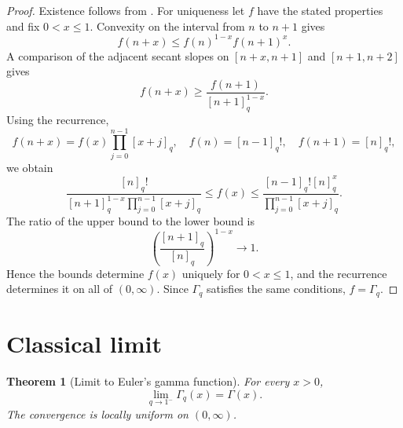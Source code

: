 \documentclass[11pt,a4paper,oneside,openany]{book}
\newtheorem{theorem}{Theorem}[chapter]
\theoremstyle{definition}
\theoremstyle{remark}
\begin{document}
\begin{proof}
Existence follows from .  For uniqueness let $f$ have the stated properties and fix $0<x\le1$.  Convexity on the interval from $n$ to $n+1$ gives
\[
 f(n+x)\le f(n)^{1-x}f(n+1)^x.
\]
A comparison of the adjacent secant slopes on $[n+x,n+1]$ and $[n+1,n+2]$ gives
\[
 f(n+x)\ge\frac{f(n+1)}{[n+1]_q^{1-x}}.
\]
Using the recurrence,
\[
 f(n+x)=f(x)\prod_{j=0}^{n-1}[x+j]_q,
 \quad
 f(n)=[n-1]_q!,
 \quad
 f(n+1)=[n]_q!,
\]
we obtain
\[
 \frac{[n]_q!}
 {[n+1]_q^{1-x}\prod_{j=0}^{n-1}[x+j]_q}
 \le f(x)\le
 \frac{[n-1]_q![n]_q^x}
 {\prod_{j=0}^{n-1}[x+j]_q}.
\]
The ratio of the upper bound to the lower bound is
\[
 \left(\frac{[n+1]_q}{[n]_q}\right)^{1-x}\longrightarrow1.
\]
Hence the bounds determine $f(x)$ uniquely for $0<x\le1$, and the recurrence determines it on all of $(0,\infty)$.  Since $\Gamma_q$ satisfies the same conditions, $f=\Gamma_q$.
\end{proof}

\section{Classical limit}

\begin{theorem}[Limit to Euler's gamma function]\label{thm:qgamma-classical-limit}
For every $x>0$,
\[
 \lim_{q\to1^-}\Gamma_q(x)=\Gamma(x).
\]
The convergence is locally uniform on $(0,\infty)$.
\end{theorem}
\end{document}
